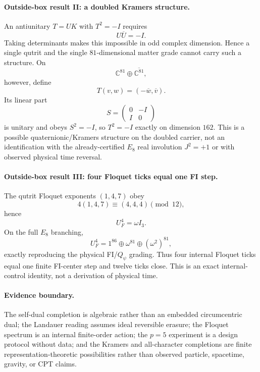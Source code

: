 \paragraph{Outside-box result II: a doubled Kramers structure.}
An antiunitary \(T=UK\) with \(T^2=-I\) requires
\[
U\overline U=-I.
\]
Taking determinants makes this impossible in odd complex dimension.  Hence a
single qutrit and the single \(81\)-dimensional matter grade cannot carry
such a structure.  On
\[
\mathbb C^{81}\oplus\overline{\mathbb C^{81}},
\]
however, define
\[
\boxed{
T(v,w)=(-\overline w,\overline v).
}
\]
Its linear part
\[
S=
\begin{pmatrix}
0&-I\\
I&0
\end{pmatrix}
\]
is unitary and obeys \(S^2=-I\), so \(T^2=-I\) exactly on dimension
\(162\).  This is a possible quaternionic/Kramers structure on the doubled
carrier, not an identification with the already-certified \(E_8\) real
involution \(J^2=+1\) or with observed physical time reversal.

\paragraph{Outside-box result III: four Floquet ticks equal one FI step.}
The qutrit Floquet exponents \((1,4,7)\) obey
\[
4(1,4,7)\equiv(4,4,4)\pmod{12},
\]
hence
\[
\boxed{U_F^4=\omega I_3.}
\]
On the full \(E_8\) branching,
\[
\boxed{
U_F^4=1^{86}\oplus\omega^{81}\oplus(\omega^2)^{81},
}
\]
exactly reproducing the physical FI/\(Q_\psi\) grading.  Thus four internal
Floquet ticks equal one finite FI-center step and twelve ticks close.  This is
an exact internal-control identity, not a derivation of physical time.

\paragraph{Evidence boundary.}
The self-dual completion is algebraic rather than an embedded circumcentric
dual; the Landauer reading assumes ideal reversible erasure; the Floquet
spectrum is an internal finite-order action; the \(p=5\) experiment is a
design protocol without data; and the Kramers and all-character completions
are finite representation-theoretic possibilities rather than observed
particle, spacetime, gravity, or CPT claims.
